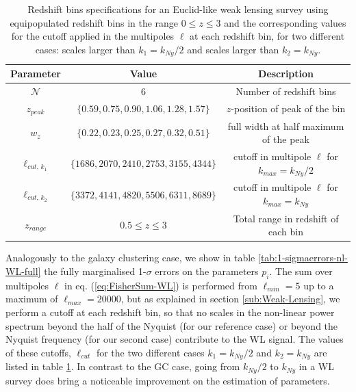 

\begin{table}
\footnotesize
\centering{}%
\begin{tabular}{|c|c|c|}
\hline 
\textbf{Parameter}  & \textbf{Value}  & \textbf{Description}\tabularnewline
\hline 
$\mathcal{N}$  & 6  & Number of redshift bins\tabularnewline
$z_{peak}$  & $\{0.59,0.75,0.90,1.06,1.28,1.57\}$  & $z$-position of peak of the bin\tabularnewline
$w_{z}$  & $\{0.22,0.23,0.25,0.27,0.32,0.51\}$  & full width at half maximum of the peak\tabularnewline
$\ell_{cut,\, k_{1}}$  & $\{1686,2070,2410,2753,3155,4344\}$  & cutoff in multipole $\ell$ for $k_{max}=k_{Ny}/2$\tabularnewline
$\ell_{cut,\, k_{2}}$  & $\{3372,4141,4820,5506,6311,8689\}$  & cutoff in multipole $\ell$ for $k_{max}=k_{Ny}$\tabularnewline
$z_{range}$  & $0.5\leq z\leq3$  & Total range in redshift of each bin\tabularnewline
\hline 
\end{tabular}
\caption[Redshift bin specifications for a Euclid WL Fisher forecast]{\label{tab:WL-zbins-specs} Redshift bins specifications for an Euclid-like
weak lensing survey using equipopulated redshift bins in the range
$0\leq z\leq3$ and the corresponding values for the cutoff applied
in the multipoles $\ell$ at each redshift bin, for two different
cases: scales larger than $k_{1}=k_{Ny}/2$ and scales larger than
$k_{2}=k_{Ny}$.}
\end{table}
\normalsize

Analogously to the galaxy clustering case, we show in table \ref{tab:1-sigmaerrors-nl-WL-full}
the fully marginalised 1-$\sigma$ errors on the parameters $p_{i}$.
The sum over multipoles $\ell$ in eq. (\ref{eq:FisherSum-WL}) is
performed from $\ell_{min}=5$ up to a maximum of $\ell_{max}=20000$,
but as explained in section \ref{sub:Weak-Lensing}, we perform a
cutoff at each redshift bin, so that no scales in the non-linear power
spectrum beyond the half of the Nyquist (for our reference case) or
beyond \done{} the Nyquist frequency (for our second case) contribute to the
WL signal. The values of these cutoffs, $\ell_{cut}$ for the two
different cases $k_{1}=k_{Ny}/2$ and $k_{2}=k_{Ny}$ are listed in
table \ref{tab:WL-zbins-specs}. In contrast to the GC case, going
from $k_{Ny}/2$ to $k_{Ny}$ in a WL survey does bring a noticeable
improvement on the estimation of parameters.

